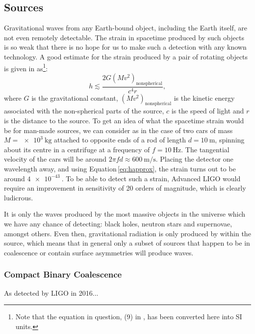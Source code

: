 \subsection{Sources}
Gravitational waves from any Earth-bound object, including the Earth itself, are not even remotely detectable. The strain in spacetime produced by such objects is so weak that there is no hope for us to make such a detection with any known technology. A good estimate for the strain produced by a pair of rotating objects is given in \cite{Sathyaprakash2009} as\footnote{Note that the equation in question, (9) in \cite{Sathyaprakash2009}, has been converted here into SI units.}:
\begin{equation}
  \label{eq:happrox}
  h \lesssim \frac{2 G \left( M v^{2} \right)_{\text{nonspherical}}}{c^4 r},
\end{equation}
where $G$ is the gravitational constant, $\left( M v^{2} \right)_{\text{nonspherical}}$ is the kinetic energy associated with the non-spherical parts of the source, $c$ is the speed of light and $r$ is the distance to the source. To get an idea of what the spacetime strain would be for man-made sources, we can consider as in \cite{Sathyaprakash2009} the case of two cars of mass $M = \SI{e3}{\kilo\gram}$ attached to opposite ends of a rod of length $d = \SI{10}{\meter}$, spinning about its centre in a centrifuge at a frequency of $f = \SI{10}{\hertz}$. The tangential velocity of the cars will be around $2 \pi f d \approx \SI{600}{\meter\per\second}$. Placing the detector one wavelength away, and using Equation\,\ref{eq:happrox}, the strain turns out to be around $\SI{4e-43}{}$. To be able to detect such a strain, Advanced LIGO would require an improvement in sensitivity of \SI{20}{} orders of magnitude, which is clearly ludicrous.

It is only the waves produced by the most massive objects in the universe which we have any chance of detecting: black holes, neutron stars and supernovae, amongst others. Even then, gravitational radiation is only produced by  within the source, which means that in general only a subset of sources that happen to be in coalescence or contain surface asymmetries will produce waves.

\subsubsection{Compact Binary Coalescence}
As detected by LIGO in 2016...

